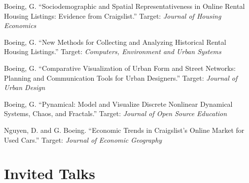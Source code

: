 \documentclass{academiccv}
\begin{document}
\begin{tablist}

\item[\the\year] \tab Boeing, G. \enquote{Sociodemographic and Spatial Representativeness in Online Rental Housing Listings: Evidence from Craigslist.} Target: \emph{Journal of Housing Economics}

\item[\the\year] \tab Boeing, G. \enquote{New Methods for Collecting and Analyzing Historical Rental Housing Listings.} Target: \emph{Computers, Environment and Urban Systems}

\item[\the\year] \tab Boeing, G. \enquote{Comparative Visualization of Urban Form and Street Networks: Planning and Communication Tools for Urban Designers.} Target: \emph{Journal of Urban Design}

\item[\the\year] \tab Boeing, G. \enquote{Pynamical: Model and Visualize Discrete Nonlinear Dynamical Systems, Chaos, and Fractals.} Target: \emph{Journal of Open Source Education}

\item[\the\year] \tab Nguyen, D. and G. Boeing. \enquote{Economic Trends in Craigslist's Online Market for Used Cars.} Target: \emph{Journal of Economic Geography}

\end{tablist}



\section*{Invited Talks}
\end{document}
